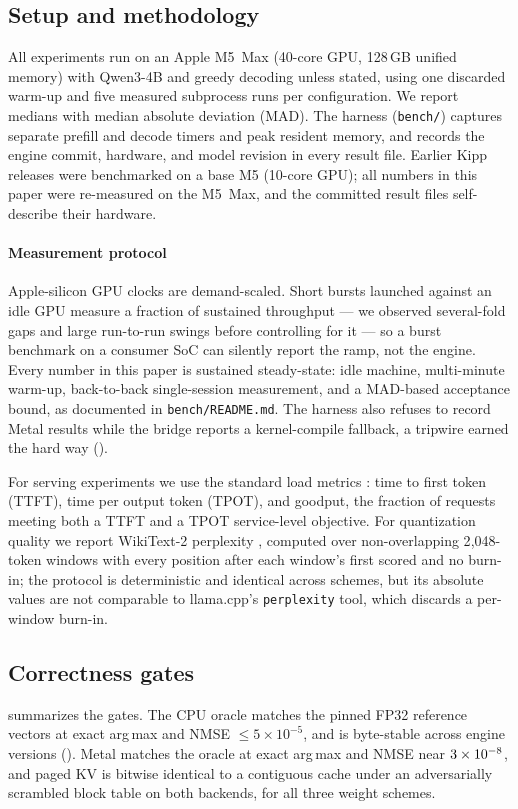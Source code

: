 \documentclass[sigconf,nonacm,screen]{acmart}
\newcommand{\code}[1]{\texttt{\small #1}}
\begin{document}
\subsection{Setup and methodology}
\label{sec:eval-setup}
All experiments run on an Apple M5~Max (40-core GPU, 128\,GB unified memory)
with Qwen3-4B and greedy decoding unless stated, using one discarded warm-up
and five measured subprocess runs per configuration. We report medians with
median absolute deviation (MAD). The harness (\code{bench/}) captures
separate prefill and decode timers and peak resident memory, and records the
engine commit, hardware, and model revision in every result file. Earlier
Kipp releases were benchmarked on a base M5 (10-core GPU); all numbers in
this paper were re-measured on the M5~Max, and the committed result files
self-describe their hardware.

\paragraph{Measurement protocol}
Apple-silicon GPU clocks are demand-scaled. Short bursts launched against an
idle GPU measure a fraction of sustained throughput --- we observed
several-fold gaps and large run-to-run swings before controlling for it
--- so a burst benchmark on a consumer SoC can silently report the ramp, not
the engine. Every number in this paper is sustained steady-state: idle
machine, multi-minute warm-up, back-to-back single-session measurement, and
a MAD-based acceptance bound, as documented in \code{bench/README.md}. The
harness also refuses to record Metal results while the bridge reports a
kernel-compile fallback, a tripwire earned the hard way
().

For serving experiments we use the standard load metrics
\citep{zhong2024distserve}: time to first token (TTFT), time per output
token (TPOT), and goodput, the fraction of requests meeting both a TTFT and
a TPOT service-level objective. For quantization quality we report WikiText-2
perplexity \citep{li2024evalquant}, computed over non-overlapping
2{,}048-token windows with every position after each window's first scored
and no burn-in; the protocol is deterministic and identical across schemes,
but its absolute values are not comparable to llama.cpp's
\code{perplexity} tool, which discards a per-window burn-in.

\subsection{Correctness gates}
\label{sec:eval-correct}
 summarizes the gates. The CPU oracle matches the pinned
FP32 reference vectors at exact arg\,max and NMSE $\le 5\times10^{-5}$,
and is byte-stable across engine versions
(). Metal matches the oracle at exact arg\,max and
NMSE near $3\times 10^{-8}$, and paged KV is bitwise identical to a
contiguous cache under an adversarially scrambled block table on both
backends, for all three weight schemes.
\end{document}
